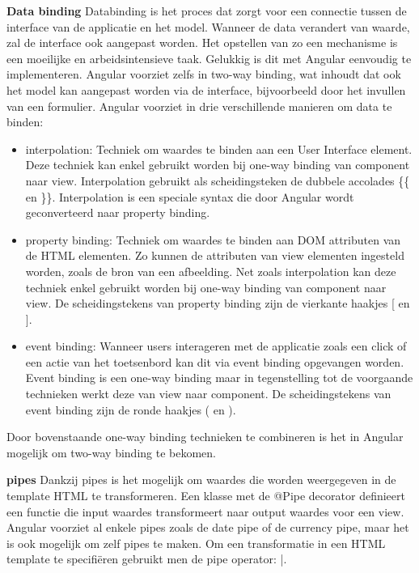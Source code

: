 \textbf{Data binding} \hspace{1cm} Databinding is het proces dat zorgt voor een connectie tussen de interface van de applicatie en het model. Wanneer de data verandert van waarde, zal de interface ook aangepast worden. Het opstellen van zo een mechanisme is een moeilijke en arbeidsintensieve taak. Gelukkig is dit met Angular eenvoudig te implementeren. Angular voorziet zelfs in two-way binding, wat inhoudt dat ook het model kan aangepast worden via de interface, bijvoorbeeld door het invullen van een formulier. Angular voorziet in drie verschillende manieren om data te binden:
\begin{itemize}
	\item interpolation: Techniek om waardes te binden aan een User Interface element.
	Deze techniek kan enkel gebruikt worden bij one-way binding van component naar view. Interpolation gebruikt als scheidingsteken de dubbele accolades \{\{ en \}\}. Interpolation is een speciale syntax die door Angular wordt geconverteerd naar property binding.
	\item property binding: Techniek om waardes te binden aan DOM attributen van de HTML elementen. Zo kunnen de attributen van view elementen ingesteld worden, zoals de bron van een afbeelding. Net zoals interpolation kan deze techniek enkel gebruikt worden bij one-way binding van component naar view. De scheidingstekens van property binding zijn de vierkante haakjes [ en ].
	\item event binding: Wanneer users interageren met de applicatie zoals een click of een actie van het toetsenbord kan dit via event binding opgevangen worden. Event binding is een one-way binding maar in tegenstelling tot de voorgaande technieken werkt deze van view naar component. De scheidingstekens van event binding zijn de ronde haakjes ( en ). 
\end{itemize}
Door bovenstaande one-way binding technieken te combineren is het in Angular mogelijk om two-way binding te bekomen. 

\textbf{pipes} \hspace{1cm} Dankzij pipes is het mogelijk om waardes die worden weergegeven in de template HTML te transformeren. Een klasse met de @Pipe decorator definieert een functie die input waardes transformeert naar output waardes voor een view. Angular voorziet al enkele pipes zoals de date pipe of de currency pipe, maar het is ook mogelijk om zelf pipes te maken. Om een transformatie in een HTML template te specifiëren gebruikt men de pipe operator: |. 

